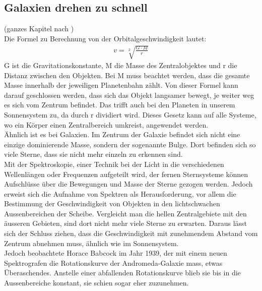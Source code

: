 \subsection{Galaxien drehen zu schnell}
(ganzes Kapitel nach \cite{Bührke2022})\\
Die Formel zu Berechnung von der Orbitalgeschwindigkeit lautet:
\begin{align*}    
    v = \sqrt[2]{\frac{G \cdot M}{r}}
\end{align*}
G ist die Gravitationskonstante, M die Masse des Zentralobjektes und r die Distanz zwischen den Objekten. Bei M muss beachtet werden, dass die gesamte Masse innerhalb der jeweiligen Planetenbahn zählt. 
Von dieser Formel kann darauf geschlossen werden, dass sich das Objekt langsamer bewegt, je weiter weg es sich vom Zentrum befindet. Das trifft auch bei den Planeten in unserem Sonnensystem zu, da durch r dividiert wird.
Dieses Gesetz kann auf alle Systeme, wo ein Körper einen Zentralbereich umkreist, angewendet werden. \\Ähnlich ist es bei Galaxien. Im Zentrum der Galaxie befindet sich nicht eine einzige dominierende Masse, sondern der sogenannte Bulge. 
Dort befinden sich so viele Sterne, dass sie nicht mehr einzeln zu erkennen sind.\\ Mit der Spektroskopie, einer Technik bei der Licht in die verschiedenen Wellenlängen oder Frequenzen aufgeteilt wird, der fernen Sternsysteme können Aufschlüsse über die Bewegungen und Masse der Sterne gezogen werden.
Jedoch erweist sich die Aufnahme von Spektren als Herausforderung, vor allem die Bestimmung der Geschwindigkeit von Objekten in den lichtschwachen Aussenbereichen der Scheibe. Vergleicht man die hellen Zentralgebiete mit den äusseren Gebieten, sind dort nicht mehr viele Sterne zu erwarten. 
Daraus lässt sich der Schluss ziehen, dass die Geschwindigkeit mit zunehmendem Abstand vom Zentrum abnehmen muss, ähnlich wie im Sonnensystem.\\
Jedoch beobachtete Horace Babcock im Jahr 1939, der mit einem neuen Spektrografen die Rotationskurve der Andromeda-Galaxie mass, etwas Überaschendes. Anstelle einer abfallenden Rotationskurve blieb sie bis in die Aussenbereiche konstant, sie schien sogar eher zuzunehmen.

